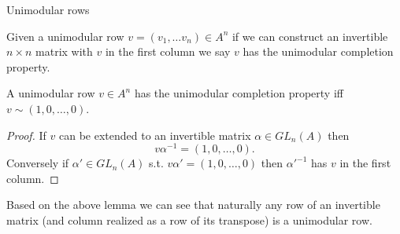 \documentclass{beamer}
\begin{document}
\begin{frame}[allowframebreaks]{Unimodular rows}
	\begin{definition}
		Given a unimodular row $v=(v_1,\dots v_n) \in A^n$ if we can construct an invertible $n \times n $  matrix with $v$ in the first column we say $v$ has the unimodular completion property.
	\end{definition}
	
	\begin{lemma}
		A unimodular row $v \in A^n$ has the unimodular completion property iff $v \sim (1,0,\dots ,0)$.
	\end{lemma}
	\begin{proof}
		If $v$ can be extended to an invertible matrix $\alpha \in GL_n(A)$ then \[ v\alpha^{-1}  = (1,0,\dots, 0). \]
		Conversely if $\alpha' \in GL_n(A) $ s.t. $v\alpha'=(1,0,\dots,0)$ then $\alpha'^{-1}$ has $v$ in the first column.
	\end{proof}
	\begin{corollary}\label{row-of-inv-mat-unimod}
		Based on the above lemma we can see that naturally any row of an invertible matrix (and column realized as a row of its transpose) is a unimodular row. 
	\end{corollary}
%	
\end{frame}
\end{document}
